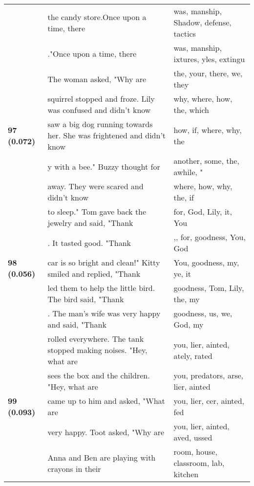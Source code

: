\documentclass{article}
\begin{document}
\begin{adjustbox}{max width=\textwidth}
\begin{tabular}{p{} p{} p{}}
 & the candy store.Once upon a time, there & was, manship, Shadow,  defense,  tactics \\
 & ."Once upon a time, there & was, manship, ixtures, yles,  extingu \\
\midrule
\multirow{5}{*}{\textbf{97 (0.072)}} & The woman asked, "Why are & the,  your,  there,  we,  they \\
 & squirrel stopped and froze. Lily was confused and didn't know & why,  where,  how,  the,  which \\
 & saw a big dog running towards her. She was frightened and didn't know & how,  if,  where,  why,  the \\
 & y with a bee."  Buzzy thought for & another,  some,  the,  awhile,  " \\
 & away. They were scared and didn't know & where,  how,  why,  the,  if \\
\midrule
\multirow{5}{*}{\textbf{98 (0.056)}} & to sleep." Tom gave back the jewelry and said, "Thank & for,  God,  Lily,  it,  You \\
 & . It tasted good.  "Thank & ,,  for,  goodness,  You,  God \\
 & car is so bright and clean!" Kitty smiled and replied, "Thank & You,  goodness,  my,  ye,  it \\
 & led them to help the little bird. The bird said, "Thank & goodness,  Tom,  Lily,  the,  my \\
 & . The man's wife was very happy and said, "Thank & goodness,  us,  we,  God,  my \\
\midrule
\multirow{5}{*}{\textbf{99 (0.093)}} & rolled everywhere. The tank stopped making noises.  "Hey, what are & you, lier, ainted, ately, rated \\
 & sees the box and the children.  "Hey, what are & you,  predators, arse, lier, ainted \\
 & came up to him and asked, "What are & you, lier, cer, ainted, fed \\
 & very happy. Toot asked, "Why are & you, lier, ainted, aved, ussed \\
 & Anna and Ben are playing with crayons in their & room,  house,  classroom,  lab,  kitchen \\
\midrule

\bottomrule
\end{tabular}
\end{adjustbox}
\end{document}
